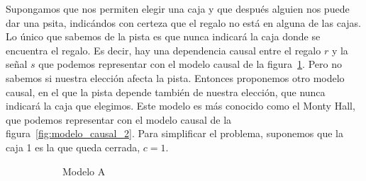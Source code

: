 \documentclass[a4paper,10pt]{book}
\theoremstyle{definition}
\begin{document}
Supongamos que nos permiten elegir una caja y que después alguien nos puede dar una psita, indicándos con certeza que el regalo no está en alguna de las cajas.
Lo único que sabemos de la pista es que nunca indicará la caja donde se encuentra el regalo.
Es decir, hay una dependencia causal entre el regalo $r$ y la señal $s$ que podemos representar con el modelo causal de la figura~\ref{fig:modelo_causal_1}.
Pero no sabemos si nuestra elección afecta la pista.
Entonces proponemos otro modelo causal, en el que la pista depende también de nuestra elección, que nunca indicará la caja que elegimos.
Este modelo es más conocido como el Monty Hall, que podemos representar con el modelo causal de la figura~\ref{fig:modelo_causal_2}.
Para simplificar el problema, suponemos que la caja 1 es la que queda cerrada, $c=1$.
%
\begin{figure}[ht!]
  \centering
  \begin{subfigure}[b]{0.48\textwidth}
  \centering
  \caption{Modelo A}
  \label{fig:modelo_causal_1}
  \end{subfigure}
  \begin{subfigure}[b]{0.48\textwidth}
  \centering
\end{subfigure}
\end{figure}
\end{document}
